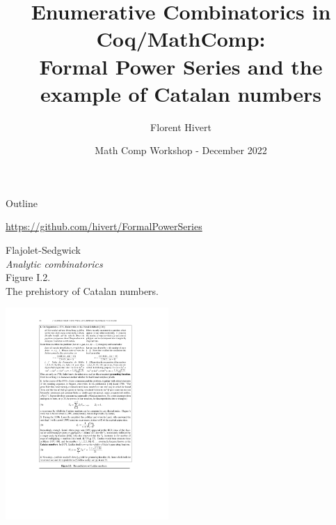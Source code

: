 \documentclass[compress,11pt]{beamer}
\title{\bf\LARGE Enumerative Combinatorics in Coq/MathComp: \\
  Formal Power Series and the example of Catalan numbers}
\author{Florent Hivert}
\institute[LISN]{
  LISN / Université Paris Saclay / CNRS}
\date[December 2022]{Math Comp Workshop - December 2022}
\begin{document}
\frame{\titlepage}

\begin{frame}{Outline}

  \begin{center}
    \url{https://github.com/hivert/FormalPowerSeries}
  \end{center}
  \tableofcontents
\end{frame}

\begin{frame}[fragile]
  \parbox{4cm}{Flajolet-Sedgwick\\
    \textit{Analytic combinatorics}\\
    Figure I.2. \\
    The prehistory of Catalan numbers.
  }\quad
  \includegraphics[align=c, trim=4.5cm 8.6cm 5cm 2.4cm, clip, width=6.2cm]{FlPage.pdf}
\end{frame}
\end{document}
